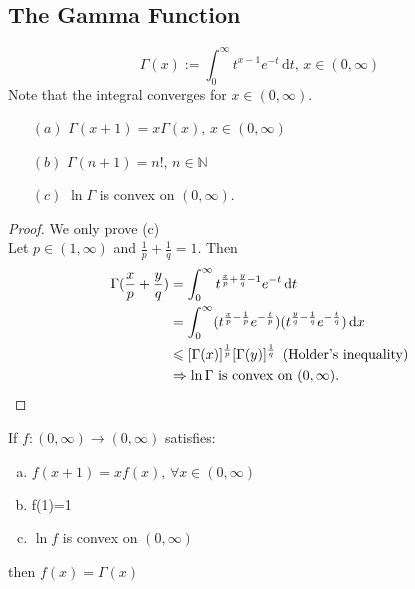   \subsection{The Gamma Function}
  \[\Gamma(x):=\int_{0}^{\infty} t^{x-1}e^{-t}\, \mathrm{d}t,\,x\in(0,\infty)  \]
  Note that the integral converges for  $ x\in(0,\infty) $.
  \begin{theorem}
    \begin{enumerate}
        \item[$ (a) $]  $ \Gamma(x+1)=x\Gamma(x),\,x\in(0,\infty) $
        \item[$ (b) $]  $ \Gamma(n+1)=n!,\,n\in\mathbb{N } $
        \item[$ (c) $]  $ \ln\Gamma $ is convex on  $ (0,\infty) $.    
    \end{enumerate}
  \end{theorem} 
  \begin{proof}
    We only prove (c) \\
    Let  $ p\in(1,\infty ) $ and  $ \frac{1 }{p }+\frac{1 }{q }=1 $.
    Then
    \begin{align*}
        \Gamma(\frac{x }{p }+\frac{y }{q })&=\int_{0}^{\infty} t^{\frac{x }{p }+\frac{y }{q }-1}e^{-t}\, \mathrm{d}t \\
        &=\int_{0}^{\infty} (t^{\frac{x }{p }-\frac{1 }{p }}e^{-\frac{t }{p }})(t^{\frac{y }{q }-\frac{1 }{q }}e^{-\frac{t }{q }})\, \mathrm{d}x \\
         &\leqslant [\Gamma(x)]^{\frac{1 }{p }}[\Gamma(y)]^{\frac{1 }{q }}\,\,\,(\text{Holder's inequality})\\
         &\Rightarrow  \text{$ \ln\Gamma $ is convex on  $ (0,\infty) $.}
    \end{align*}
  \end{proof}
  \begin{theorem}
    If  $ f:(0,\infty)\rightarrow(0,\infty) $ satisfies:
    \begin{enumerate}[(a)]
        \item  $ f(x+1)=xf(x),\,\forall x\in (0,\infty) $ 
        \item f(1)=1
        \item  $ \ln{f} $ is convex on  $ (0,\infty) $  
    \end{enumerate} 
    then  $ f(x)=\Gamma(x) $ 
  \end{theorem}
